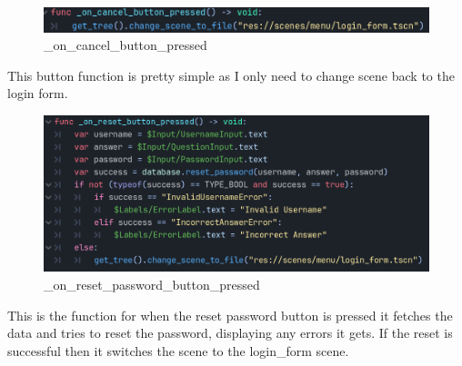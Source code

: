 \documentclass{article}
\begin{document}
        \[\]
        \begin{figure}[H]
              \centering
              \includegraphics{images/development/ResetPasswordForm_cancel.PNG}
              \caption{\_on\_cancel\_button\_pressed}
        \end{figure}
        This button function is pretty simple as I only need to change scene back to the login form.\\
        \begin{figure}[H]
                \centering
                \includegraphics{images/development/ResetPasswordForm_reset.PNG}
                \caption{\_on\_reset\_password\_button\_pressed}
        \end{figure}
        \[\]
        This is the function for when the reset password button is pressed it fetches the data and tries to reset the password, displaying any errors it gets. If the reset is successful then it switches the scene to the login\_form scene.\\
\end{document}
